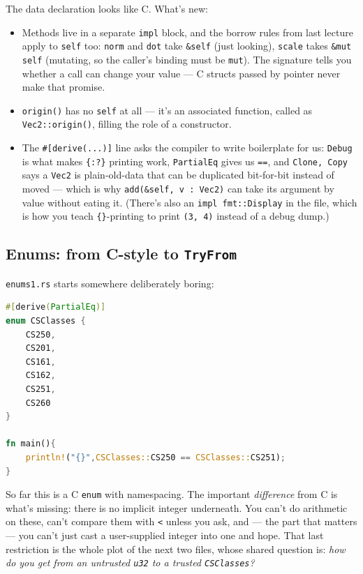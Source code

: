 \documentclass[11pt]{article}
\begin{document}
The data declaration looks like C. What's new:
\begin{itemize}
  \item Methods live in a separate \texttt{impl} block, and the
    borrow rules from last lecture apply to \texttt{self} too:
    \texttt{norm} and \texttt{dot} take \texttt{\&self} (just
    looking), \texttt{scale} takes \texttt{\&mut self} (mutating, so
    the caller's binding must be \texttt{mut}). The signature tells
    you whether a call can change your value --- C structs passed by
    pointer never make that promise.
  \item \texttt{origin()} has no \texttt{self} at all --- it's an
    associated function, called as \texttt{Vec2::origin()}, filling
    the role of a constructor.
  \item The \texttt{\#[derive(...)]} line asks the compiler to write
    boilerplate for us: \texttt{Debug} is what makes
    \texttt{\{:?\}} printing work, \texttt{PartialEq} gives us
    \texttt{==}, and \texttt{Clone, Copy} says a \texttt{Vec2} is
    plain-old-data that can be duplicated bit-for-bit instead of
    moved --- which is why \texttt{add(\&self, v : Vec2)} can take
    its argument by value without eating it. (There's also an
    \texttt{impl fmt::Display} in the file, which is how you teach
    \texttt{\{\}}-printing to print \texttt{(3, 4)} instead of a
    debug dump.)
\end{itemize}

\subsection*{Enums: from C-style to \texttt{TryFrom}}

\texttt{enums1.rs} starts somewhere deliberately boring:

\begin{lstlisting}[language=Rust]
#[derive(PartialEq)]
enum CSClasses {
    CS250,
    CS201,
    CS161,
    CS162,
    CS251,
    CS260
}

fn main(){
    println!("{}",CSClasses::CS250 == CSClasses::CS251);
}
\end{lstlisting}

So far this is a C \texttt{enum} with namespacing. The important
\emph{difference} from C is what's missing: there is no implicit
integer underneath. You can't do arithmetic on these, can't compare
them with \texttt{<} unless you ask, and --- the part that matters
--- you can't just cast a user-supplied integer into one and hope.
That last restriction is the whole plot of the next two files, whose
shared question is: \emph{how do you get from an untrusted
\texttt{u32} to a trusted \texttt{CSClasses}?}
\end{document}
